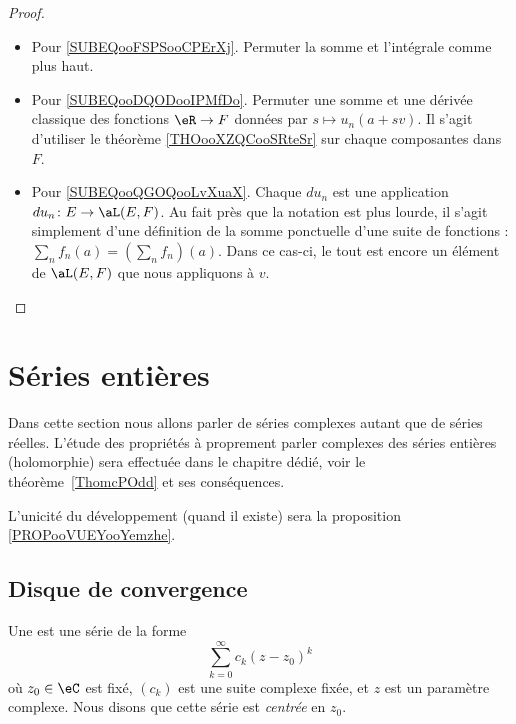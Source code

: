 \begin{proof}
\begin{subproof}
\begin{itemize}
			\item Pour \ref{SUBEQooFSPSooCPErXj}. Permuter la somme et l'intégrale comme plus haut.
			\item Pour \ref{SUBEQooDQODooIPMfDo}. Permuter une somme et une dérivée classique des fonctions \( \eR\to F\) données par \( s\mapsto u_n(a+sv)\). Il s'agit d'utiliser le théorème \ref{THOooXZQCooSRteSr} sur chaque composantes dans \( F\).
			\item Pour \ref{SUBEQooQGOQooLvXuaX}. Chaque \( du_n\) est une application \( du_n\colon E\to \aL(E,F)\). Au fait près que la notation est plus lourde, il s'agit simplement d'une définition de la somme ponctuelle d'une suite de fonctions : \( \sum_nf_n(a)=(\sum_nf_n)(a)\). Dans ce cas-ci, le tout est encore un élément de \( \aL(E,F)\) que nous appliquons à \( v\).
		\end{itemize}
	\end{subproof}
\end{proof}


\section{Séries entières}

Dans cette section nous allons parler de séries complexes autant que de séries réelles. L'étude des propriétés à proprement parler complexes des séries entières (holomorphie) sera effectuée dans le chapitre dédié, voir le théorème~\ref{ThomcPOdd} et ses conséquences.

L'unicité du développement (quand il existe) sera la proposition \ref{PROPooVUEYooYemzhe}.

\subsection{Disque de convergence}

\begin{definition}\label{DEFooYTYJooFzvKDu}
	Une  est une série de la forme
	\begin{equation}		\label{eqseriepuissance}
		\sum_{k=0}^{\infty}c_k(z-z_0)^k
	\end{equation}
	où \( z_0\in \eC\) est fixé, \( (c_k)\) est une suite complexe fixée, et \( z\) est un paramètre complexe. Nous disons que cette série est \emph{centrée} en \( z_0\).
\end{definition}

